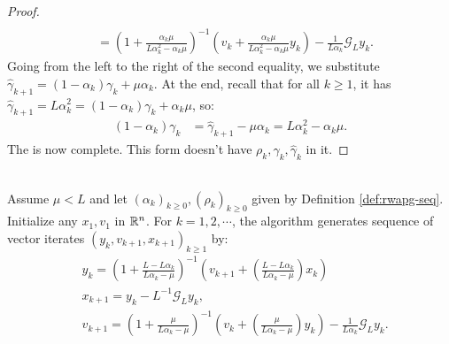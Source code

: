 \documentclass[12pt]{article}
\begin{document}
\begin{proof}
\begin{align*}
                \\
                &= 
                \left(
                    1 + \frac{\alpha_k \mu}{L \alpha_k^2 - \alpha_k \mu}
                \right)^{-1}
                \left(
                    v_k + 
                    \frac{\alpha_k \mu}{L \alpha_k^2 - \alpha_k \mu} y_k
                \right)
                - \frac{1}{L\alpha_{k}}\mathcal G_L y_k. 
            \end{align*}
            Going from the left to the right of the second equality, we substitute $\hat \gamma_{k + 1} = (1 - \alpha_k)\gamma_k + \mu\alpha_k$. 
            At the end, recall that for all $k \ge 1$, it has $\hat \gamma_{k + 1} = L \alpha_k^2 = (1 - \alpha_k)\gamma_k + \alpha_k \mu$, so: 
            \begin{align*}
                (1 - \alpha_k)\gamma_k
                &= 
                \hat \gamma_{k + 1} - \mu \alpha_k
                = 
                L\alpha_{k}^2 - \alpha_k\mu. 
            \end{align*}
            The is now complete. 
            This form doesn't have $\rho_k, \gamma_k, \hat \gamma_k$ in it. 
        \end{proof}
        \begin{definition}\label{def:r-wapg-intermediate}\;\\
            Assume $\mu < L$ and let $(\alpha_k)_{k \ge 0}, (\rho_k)_{k \ge 0}$ given by Definition \ref{def:rwapg-seq}. 
            Initialize any $x_1, v_1$ in $\mathbb R^n$. 
            For $k = 1, 2, \cdots $, the algorithm generates sequence of vector iterates $(y_{k}, v_{k + 1}, x_{k + 1})_{k \ge 1}$ by: 
            \begin{align*} 
                & y_{k} = 
                \left(
                    1 + \frac{L - L\alpha_{k}}{L\alpha_{k} - \mu}
                \right)^{-1}
                \left(
                    v_{k + 1} + 
                    \left(\frac{L - L\alpha_{k}}{L\alpha_{k} - \mu} \right) x_{k}
                \right)
                \\
                & x_{k + 1} = 
                y_k - L^{-1} \mathcal G_L y_k, 
                \\
                & v_{k + 1} = 
                \left(
                    1 + \frac{\mu}{L \alpha_k - \mu}
                \right)^{-1}
                \left(
                    v_k + 
                    \left(\frac{\mu}{L \alpha_k - \mu}\right) y_k
                \right) - \frac{1}{L\alpha_{k}}\mathcal G_L y_k. 
            \end{align*}
        \end{definition}
\end{document}
